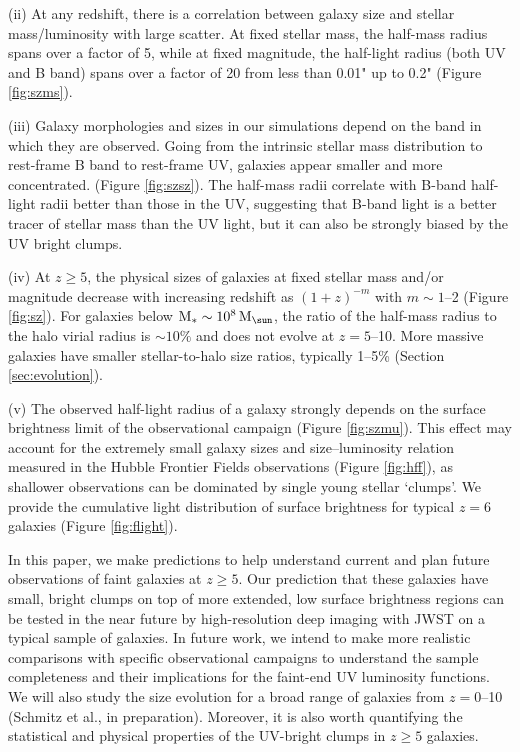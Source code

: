 \documentclass[useAMS,usenatbib]{mn2e}
\newcommand{\Ms}{{\rm M}_{\ast}}
\newcommand{\muv}{{\rm M_{UV}}}
\newcommand{\Msun}{{\rm M}_{\sun}}
\begin{document}
(ii) At any redshift, there is a correlation between galaxy size and stellar mass/luminosity with large scatter. At fixed stellar mass, the half-mass radius spans over a factor of 5, while at fixed magnitude, the half-light radius (both UV and B band) spans over a factor of 20 from less than 0.01" up to 0.2" (Figure \ref{fig:szms}).

(iii) Galaxy morphologies and sizes in our simulations depend on the band in which they are observed. Going from the intrinsic stellar mass distribution to rest-frame B band to rest-frame UV, galaxies appear smaller and more concentrated. (Figure \ref{fig:szsz}). The half-mass radii correlate with B-band half-light radii better than those in the UV, suggesting that B-band light is a better tracer of stellar mass than the UV light, but it can also be strongly biased by the UV bright clumps.

(iv) At $z\geq5$, the physical sizes of galaxies at fixed stellar mass and/or magnitude decrease with increasing redshift as $(1+z)^{-m}$ with $m\sim1$--2 (Figure \ref{fig:sz}). For galaxies below $\Ms\sim10^8\,\Msun$, the ratio of the half-mass radius to the halo virial radius is $\sim10\%$ and does not evolve at $z=5$--10. More massive galaxies have smaller stellar-to-halo size ratios, typically 1--5\% (Section \ref{sec:evolution}).

(v) The observed half-light radius of a galaxy strongly depends on the surface brightness limit of the observational campaign (Figure \ref{fig:szmu}). This effect may account for the extremely small galaxy sizes and size--luminosity relation measured in the Hubble Frontier Fields observations (Figure \ref{fig:hff}), as shallower observations can be dominated by single young stellar `clumps'. We provide the cumulative light distribution of surface brightness for typical $z=6$ galaxies (Figure \ref{fig:flight}).


In this paper, we make predictions to help understand current and plan future observations of faint galaxies at $z\geq5$. Our prediction that these galaxies have small, bright clumps on top of more extended, low surface brightness regions can be tested in the near future by high-resolution deep imaging with JWST on a typical sample of galaxies. In future work, we intend to make more realistic comparisons with specific observational campaigns to understand the sample completeness and their implications for the faint-end UV luminosity functions. We will also study the size evolution for a broad range of galaxies from $z=0$--10 (Schmitz et al., in preparation). Moreover, it is also worth quantifying the statistical and physical properties of the UV-bright clumps in $z\geq5$ galaxies.
\end{document}
